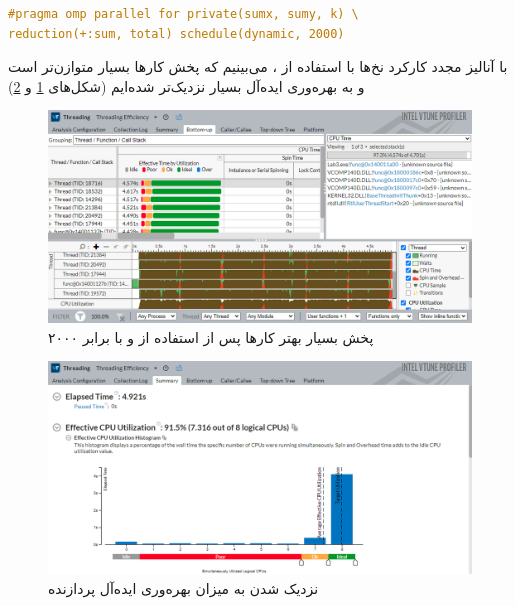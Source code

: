 \documentclass{HW}
\begin{document}
\begin{latin}
\begin{lstlisting}[language=C]
#pragma omp parallel for private(sumx, sumy, k) \
reduction(+:sum, total) schedule(dynamic, 2000)
\end{lstlisting}
\end{latin}

با آنالیز مجدد کارکرد نخ‌ها با استفاده از ، می‌بینیم که پخش کارها بسیار متوازن‌تر است و به بهره‌وری ایده‌آل بسیار نزدیک‌تر شده‌ایم (شکل‌های
\ref{fig:tune-good}
و
\ref{fig:tune-good2})

\begin{figure}[ht!]
\begin{center}
	\includegraphics[width=15cm]{images/tune-good}
\end{center}
\caption{پخش بسیار بهتر کارها پس از استفاده از  و با  برابر ۲۰۰۰}
\label{fig:tune-good}
\end{figure}

\begin{figure}[ht!]
\begin{center}
	\includegraphics[width=15cm]{images/tune-good2}
\end{center}
\caption{نزدیک شدن به میزان بهره‌وری ایده‌آل پردازنده}
\label{fig:tune-good2}
\end{figure}
\end{document}
